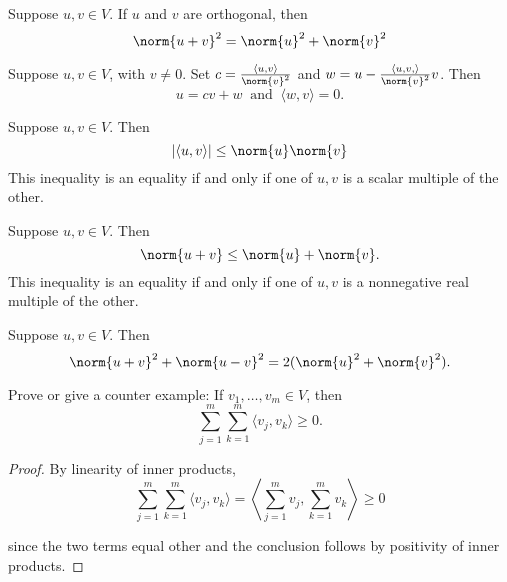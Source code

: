 \documentclass{extarticle}
\begin{document}
\begin{thm}
    Suppose \(u, v \in V\). If \(u\) and \(v\) are orthogonal, then 
    \[\norm{u + v}^2 = \norm{u}^2 + \norm{v}^2\]
\end{thm}

\begin{lemma}
    Suppose \( u, v \in V\), with \(v \neq 0\). Set \(c = \frac{\langle u,v \rangle}{\norm{v}^2}\) and 
    \(w = u - \frac{\langle u, v, \rangle}{\norm{v}^2}v\). Then 
    \[u = cv+w \ \text{ and } \ \langle w,v \rangle = 0.\]
\end{lemma}

\begin{thm}
    Suppose \(u, v \in V\). Then 
    \[|\langle u,v \rangle| \leq \norm{ u } \norm{ v }\]
    This inequality is an equality if and only if one of \(u, v\) is a scalar multiple of the other.
\end{thm}

\begin{thm}
    Suppose \(u, v \in V\). Then 
    \[\norm{ u+v }\leq \norm{ u } + \norm{ v }.\] 
    This inequality is an equality if and only if one of \(u, v\) is a nonnegative real multiple of the other.
\end{thm}

\begin{thm}
    Suppose \(u, v \in V\). Then 
    \[\norm{ u +v }^2 + \norm{ u-v }^2 = 2(\norm{u}^2 + \norm{v}^2).\]
\end{thm}


\newpage 
{}

\begin{problem}{1}
    Prove or give a counter example: If \(v_1, \ldots, v_m \in V\), then 
    \[\sum_{j=1}^{m}\sum_{k=1}^{m} \langle v_j,v_k \rangle \geq 0.\]
\end{problem}

\begin{proof}
By linearity of inner products, 
\[\sum_{j=1}^{m}\sum_{k=1}^{m} \langle v_j,v_k \rangle 
= \left\langle \sum_{j=1}^{m} v_j, \sum_{k=1}^{m} v_k \right\rangle \geq 0\]

since the two terms equal other and the conclusion follows by positivity of inner products.
\end{proof}
\end{document}
